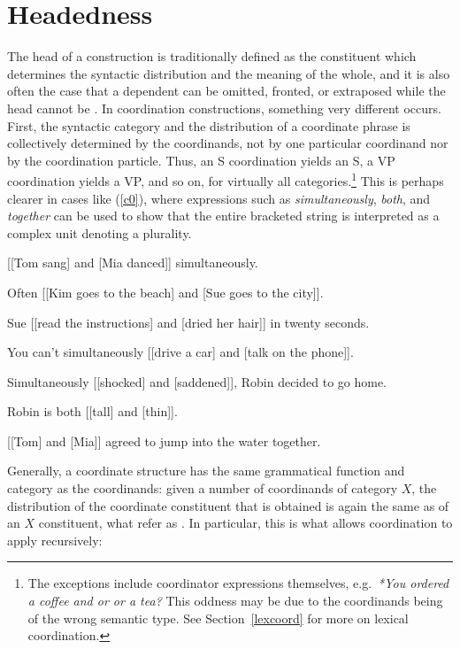 \section{Headedness}
\label{coord:sec-headedness}

The head of a construction is traditionally defined as the constituent which determines the syntactic distribution and the meaning of the whole, and it is also often the case that a dependent can be omitted, fronted, or extraposed while the head cannot be \citep{zwicky85}. In coordination constructions, something very different occurs. First, the syntactic category and the distribution of a coordinate phrase is collectively determined by the coordinands, not by one particular coordinand nor by the coordination particle. Thus, an S coordination yields an S, a VP coordination yields a VP, and so on, for virtually all categories.\footnote{The exceptions include coordinator expressions themselves, e.g.\ \emph{*You ordered a coffee and or or a tea?} This oddness may be due to the coordinands being of the wrong semantic type. See Section~\ref{lexcoord} for more on lexical coordination.}
This is perhaps clearer in cases like (\ref{c0}), where
expressions such as \emph{simultaneously}, \emph{both}, and
\emph{together} can be used to show that the entire bracketed string
is interpreted as a complex unit denoting a plurality.


\eal
\label{c0}
\ex{} [[Tom sang] and [Mia danced]] simultaneously.

\ex{} Often [[Kim goes to the beach] and [Sue goes to the city]].

\ex{} Sue [[read the instructions] and [dried her hair]] in twenty seconds.

\ex{} You can't simultaneously [[drive a car] and [talk on the phone]].

\ex{} Simultaneously [[shocked] and [saddened]], Robin decided to go home.

\ex Robin is both [[tall] and [thin]].

\ex{} [[Tom] and [Mia]] agreed to jump into the water together.
\zl


Generally, a coordinate structure has the same grammatical function and category as the coordinands: given a number of coordinands of category $X$, the distribution of the coordinate constituent that is obtained is again the same as of an $X$ constituent, what \citet[]{pullumzwicky} refer as .
In particular, this is what allows coordination to apply recursively:

